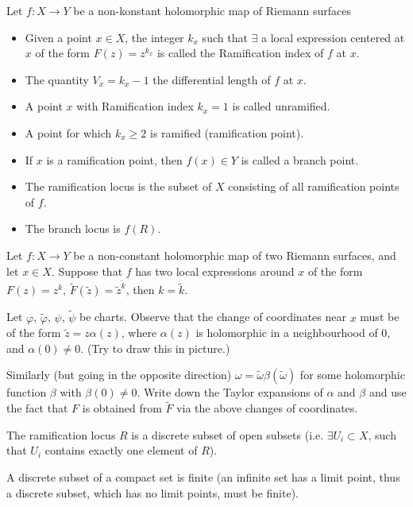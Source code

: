\documentclass[12pt]{article}					%
\begin{document}
\begin{definice}
	Let $f: X \rightarrow Y$ be a non-konstant holomorphic map of Riemann surfaces
	\begin{itemize}
		\item Given a point $x \in X$, the integer $k_x$ such that $\exists$ a local expression centered at $x$ of the form $F(z) = z^{k_x}$ is called the Ramification index of $f$ at $x$.
		\item The quantity $V_x = k_x - 1$ the differential length of $f$ at $x$.
		\item A point $x$ with Ramification index $k_x = 1$ is called unramified.
		\item A point for which $k_x ≥ 2$ is ramified (ramification point).
		\item If $x$ is a ramification point, then $f(x) \in Y$ is called a branch point.
%
%
		\item The ramification locus is the subset of $X$ consisting of all ramification points of $f$.
		\item The branch locus is $f(R)$.
	\end{itemize}
\end{definice}

\begin{priklad}
	Let $f: X \rightarrow Y$ be a non-constant holomorphic map of two Riemann surfaces, and let $x \in X$. Suppose that $f$ has two local expressions around $x$ of the form $F(z) = z^k$, $\tilde F(\tilde z) = \tilde z^{\tilde k}$, then $k = \tilde k$.

	\begin{reseni}[Hint]
		Let $φ$, $\tilde φ$, $ψ$, $\tilde ψ$ be charts. Observe that the change of coordinates near $x$ must be of the form $\tilde z = z α(z)$, where $α(z)$ is holomorphic in a neighbourhood of 0, and $α(0) ≠ 0$. (Try to draw this in picture.)

		Similarly (but going in the opposite direction) $ω = \tilde ω β(\tilde ω)$ for some holomorphic function $β$ with $β(0) ≠ 0$. Write down the Taylor expansions of $α$ and $β$ and use the fact that $F$ is obtained from $\tilde F$ via the above changes of coordinates.
	\end{reseni}
\end{priklad}

\begin{lemma}
	The ramification locus $R$ is a discrete subset of open subsets (i.e. $\exists U_i \subset X$, such that $U_i$ contains exactly one element of $R$).

	\begin{poznamkain}
		A discrete subset of a compact set is finite (an infinite set has a limit point, thus a discrete subset, which has no limit points, must be finite).
	\end{poznamkain}
\end{lemma}
\end{document}
